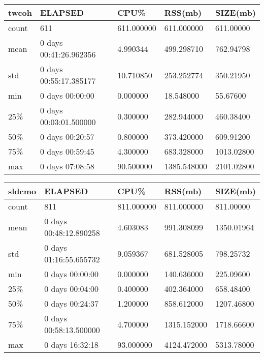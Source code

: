 \documentclass{article}
\begin{document}
\begin{tabular}{|l|l|l|l|l|}
\hline 
\hline twcoh& ELAPSED&   CPU\%&  RSS(mb)&   SIZE(mb) \\
\hline count&    611& 611.000000&  611.000000&  611.00000 \\
\hline mean&  0 days 00:41:26.962356&  4.990344&  499.298710&  762.94798 \\
\hline std&  0 days 00:55:17.385177&  10.710850&  253.252774&  350.21950 \\
\hline min&   0 days 00:00:00&  0.000000&  18.548000&  55.67600 \\
\hline 25\%&  0 days 00:03:01.500000&  0.300000&  282.944000&  460.38400 \\
\hline 50\%&   0 days 00:20:57&  0.800000&  373.420000&  609.91200 \\
\hline 75\%&   0 days 00:59:45&  4.300000&  683.328000& 1013.02800 \\
\hline max&   0 days 07:08:58&  90.500000& 1385.548000& 2101.02800 \\
\hline 
\end{tabular}
 
\begin{tabular}{|l|l|l|l|l|}
\hline 
\hline sldcmo& ELAPSED&   CPU\%&  RSS(mb)&   SIZE(mb) \\
\hline count&    811& 811.000000&  811.000000&  811.00000 \\
\hline mean&  0 days 00:48:12.890258&  4.603083&  991.308099& 1350.01964 \\
\hline std&  0 days 01:16:55.655732&  9.059367&  681.528005&  798.25732 \\
\hline min&   0 days 00:00:00&  0.000000&  140.636000&  225.09600 \\
\hline 25\%&   0 days 00:04:00&  0.400000&  402.364000&  658.48400 \\
\hline 50\%&   0 days 00:24:37&  1.200000&  858.612000& 1207.46800 \\
\hline 75\%&  0 days 00:58:13.500000&  4.700000& 1315.152000& 1718.66600 \\
\hline max&   0 days 16:32:18&  93.000000& 4124.472000& 5313.78000 \\
\hline 
\end{tabular}
 
\end{document}
